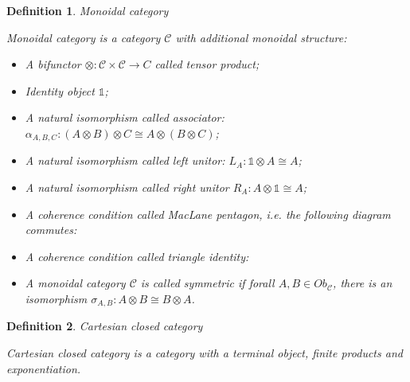 \documentclass[a4paper]{article}
\newtheorem{defin}{Definition}
\begin{document}
\begin{defin} Monoidal category

  Monoidal category is a category $\mathcal{C}$ with additional monoidal structure:
  \begin{itemize}
    \item A bifunctor $\otimes : \mathcal{C} \times \mathcal{C} \to C$ called tensor product;
    \item Identity object $\mathds{1}$;
    \item A natural isomorphism called associator: $\alpha_{A,B,C}: (A \otimes B) \otimes C \cong A \otimes (B \otimes C)$;
    \item A natural isomorphism called left unitor: $L_A : \mathds{1} \otimes A \cong A$;
    \item A natural isomorphism called right unitor $R_A : A \otimes \mathds{1} \cong A$;
    \item A coherence condition called MacLane pentagon, i.e. the following diagram commutes:

    \item A coherence condition called triangle identity:


    \item A monoidal category $\mathcal{C}$ is called symmetric if forall $A,B \in Ob_{\mathcal{C}}$, there is an isomorphism $\sigma_{A,B} : A \otimes B \cong B \otimes A$.
  \end{itemize}
\end{defin}

\begin{defin} Cartesian closed category

  Cartesian closed category is a category with a terminal object, finite products and exponentiation.
\end{defin}
\end{document}
